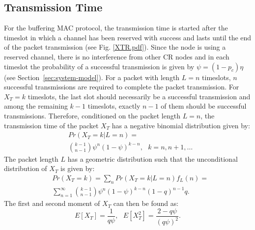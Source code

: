 \documentclass[12pt,journal,oneside,onecolumn]{IEEEtran}
\begin{document}
\subsection{Transmission Time}
\label{sec:tx}
For the buffering MAC protocol, the transmission time is started after the timeslot in which a channel has been reserved with success and lasts
until  the end of the packet transmission (see Fig. \ref{XTR.pdf}).
Since the node is using a reserved channel, there is no interference from other CR nodes and in each timeslot the probability of
a successful transmission is given by $\psi=(1-p_c)\eta$ (see Section~\ref{sec:system-model}).
For a packet with length $L=n$ timeslots, $n$ successful transmissions are required to complete
the packet transmission. For $X_T=k$ timeslots, the last slot should necessarily be a successful transmission and
among the remaining $k-1$ timeslots, exactly $n-1$ of them should be successful transmissions. Therefore, conditioned on the packet length $L=n$,
the transmission time of the packet  $X_T$  has a negative binomial distribution 
given by:
\begin{align}
&Pr(X_T=k|L=n)= \nonumber \\
&{k-1\choose n-1} \psi ^{n} (1-\psi)^{k-n}, \mbox{  } k=n,n+1,\dots
\label{eq:}
\end{align}
The packet length $L$ has a geometric distribution such that 
the unconditional distribution of $X_T$ is given by:
\begin{align}
&Pr(X_T=k) = \sum_{n} {Pr(X_T=k|L=n) f_L(n)} = \nonumber \\
&\sum_{n=1}^{\infty} {{k-1\choose n-1} \psi ^{n} (1-\psi)^{k-n} (1-q)^{n-1} q}.
\label{eq:}
\end{align}
The first and second moment of $X_T$ can then be found as:
\begin{equation}
E[X_T] = \frac{1}{q \psi} , \mbox{ } E[X^2_T] = \frac{2-q\psi}{(q \psi)^2}.
\label{eq:}
\end{equation}
\end{document}
